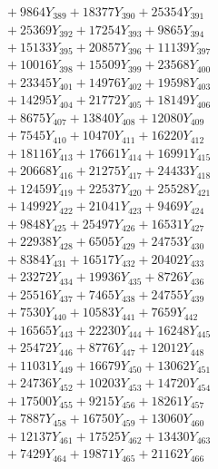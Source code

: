 \documentclass[a4paper,10pt]{article}
\begin{document}
{\begin{align}
&\;  + 9864 Y_{389} + 18377 Y_{390} + 25354 Y_{391} \\[0.3ex]
&\;  + 25369 Y_{392} + 17254 Y_{393} + 9865 Y_{394} \\[0.3ex]
&\;  + 15133 Y_{395} + 20857 Y_{396} + 11139 Y_{397} \\[0.3ex]
&\;  + 10016 Y_{398} + 15509 Y_{399} + 23568 Y_{400} \\[0.3ex]
&\;  + 23345 Y_{401} + 14976 Y_{402} + 19598 Y_{403} \\[0.3ex]
&\;  + 14295 Y_{404} + 21772 Y_{405} + 18149 Y_{406} \\[0.3ex]
&\;  + 8675 Y_{407} + 13840 Y_{408} + 12080 Y_{409} \\[0.3ex]
&\;  + 7545 Y_{410} + 10470 Y_{411} + 16220 Y_{412} \\[0.3ex]
&\;  + 18116 Y_{413} + 17661 Y_{414} + 16991 Y_{415} \\[0.3ex]
&\;  + 20668 Y_{416} + 21275 Y_{417} + 24433 Y_{418} \\[0.5ex]\allowbreak
&\;  + 12459 Y_{419} + 22537 Y_{420} + 25528 Y_{421} \\[0.3ex]
&\;  + 14992 Y_{422} + 21041 Y_{423} + 9469 Y_{424} \\[0.3ex]
&\;  + 9848 Y_{425} + 25497 Y_{426} + 16531 Y_{427} \\[0.3ex]
&\;  + 22938 Y_{428} + 6505 Y_{429} + 24753 Y_{430} \\[0.3ex]
&\;  + 8384 Y_{431} + 16517 Y_{432} + 20402 Y_{433} \\[0.3ex]
&\;  + 23272 Y_{434} + 19936 Y_{435} + 8726 Y_{436} \\[0.3ex]
&\;  + 25516 Y_{437} + 7465 Y_{438} + 24755 Y_{439} \\[0.3ex]
&\;  + 7530 Y_{440} + 10583 Y_{441} + 7659 Y_{442} \\[0.3ex]
&\;  + 16565 Y_{443} + 22230 Y_{444} + 16248 Y_{445} \\[0.3ex]
&\;  + 25472 Y_{446} + 8776 Y_{447} + 12012 Y_{448} \\[0.5ex]\allowbreak
&\;  + 11031 Y_{449} + 16679 Y_{450} + 13062 Y_{451} \\[0.3ex]
&\;  + 24736 Y_{452} + 10203 Y_{453} + 14720 Y_{454} \\[0.3ex]
&\;  + 17500 Y_{455} + 9215 Y_{456} + 18261 Y_{457} \\[0.3ex]
&\;  + 7887 Y_{458} + 16750 Y_{459} + 13060 Y_{460} \\[0.3ex]
&\;  + 12137 Y_{461} + 17525 Y_{462} + 13430 Y_{463} \\[0.3ex]
&\;  + 7429 Y_{464} + 19871 Y_{465} + 21162 Y_{466} \\[0.3ex]

\end{align}}
\end{document}
